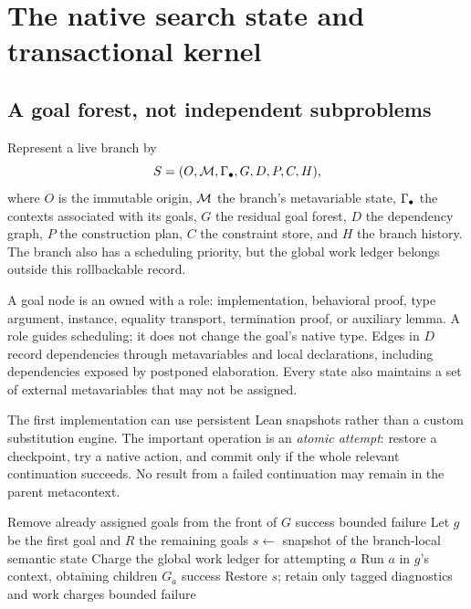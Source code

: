 \section{The native search state and transactional kernel}
\label{sec:state}

\subsection{A goal forest, not independent subproblems}

Represent a live branch by
\[
 S=(O,\mathcal M,\Gamma_{\bullet},G,D,P,C,H),
\]
where $O$ is the immutable origin, $\mathcal M$ the branch's metavariable state, $\Gamma_{\bullet}$ the contexts associated with its goals, $G$ the residual goal forest, $D$ the dependency graph, $P$ the construction plan, $C$ the constraint store, and $H$ the branch history. The branch also has a scheduling priority, but the global work ledger belongs outside this rollbackable record.

A goal node is an owned  with a role: implementation, behavioral proof, type argument, instance, equality transport, termination proof, or auxiliary lemma. A role guides scheduling; it does not change the goal's native type. Edges in $D$ record dependencies through metavariables and local declarations, including dependencies exposed by postponed elaboration. Every state also maintains a set of external metavariables that may not be assigned.

The first implementation can use persistent Lean snapshots rather than a custom substitution engine. The important operation is an \emph{atomic attempt}: restore a checkpoint, try a native action, and commit only if the whole relevant continuation succeeds. No result from a failed continuation may remain in the parent metacontext.

\begin{algorithm}[ht]
\caption{Dependency-preserving depth-bounded reference search}
\label{alg:forest}
\begin{algorithmic}[1]
  \State Remove already assigned goals from the front of $G$
   \State \Return success \EndIf
   \State \Return bounded failure \EndIf
  \State Let $g$ be the first goal and $R$ the remaining goals
    \State $s\gets$ snapshot of the branch-local semantic state
    \State Charge the global work ledger for attempting $a$
    \State Run $a$ in $g$'s context, obtaining children $G_a$
      \State \Return success
    \EndIf
    \State Restore $s$; retain only tagged diagnostics and work charges
  \EndFor
  \State \Return bounded failure
\EndFunction
\end{algorithmic}
\end{algorithm}

